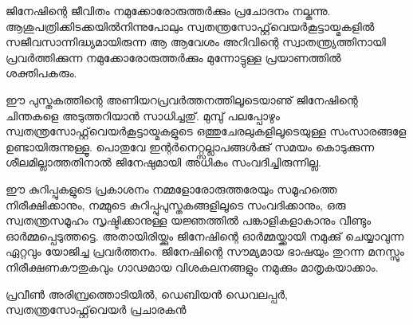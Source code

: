 
ജിനേഷിന്റെ ജീവിതം നമുക്കോരോരുത്തര്‍ക്കും പ്രചോദനം നല്കുന്നു. ആശുപത്രിക്കിടക്കയില്‍നിന്നുപോലും സ്വതന്ത്രസോഫ്റ്റ്‌വെയര്‍കൂട്ടായ്മകളില്‍ സജീവസാന്നിദ്ധ്യമായിരുന്ന ആ ആവേശം അറിവിന്റെ സ്വാതന്ത്ര്യത്തിനായി പ്രവര്‍ത്തിക്കുന്ന നമുക്കോരോരുത്തര്‍ക്കും മുന്നോട്ടുള്ള പ്രയാണത്തില്‍ ശക്തിപകരും. 

ഈ പുസ്തകത്തിന്റെ അണിയറപ്രവര്‍ത്തനത്തിലൂടെയാണു് ജിനേഷിന്റെ ചിന്തകളെ അടുത്തറിയാന്‍ സാധിച്ചതു്. മുമ്പു് പലപ്പോഴും സ്വതന്ത്രസോഫ്റ്റ്‌വെയര്‍കൂട്ടായ്മകളുടെ ഒത്തുചേരലുകളിലൂടെയുള്ള സംസാരങ്ങളേ ഉണ്ടായിരുന്നുള്ളൂ. പൊതുവേ ഇന്റര്‍നെറ്റ്സല്ലാപങ്ങള്‍ക്കു് സമയം കൊടുക്കുന്ന ശീലമില്ലാത്തതിനാല്‍ ജിനേഷുമായി അധികം സംവദിച്ചിരുന്നില്ല.

ഈ കുറിപ്പുകളുടെ പ്രകാശനം നമ്മളോരോരുത്തരേയും സമൂഹത്തെ നിരീക്ഷിക്കാനും, നമ്മുടെ കുറിപ്പുപുസ്തകങ്ങളിലൂടെ സംവദിക്കാനും, ഒരു സ്വതന്ത്രസമൂഹം സൃഷ്ടിക്കാനുള്ള യജ്ഞത്തില്‍ പങ്കാളികളാകാനും വീണ്ടും ഓര്‍മ്മപ്പെടുത്തട്ടെ. അതായിരിയ്ക്കും ജിനേഷിന്റെ ഓര്‍മ്മയ്ക്കായി നമുക്കു് ചെയ്യാവുന്ന ഏറ്റവും യോജിച്ച പ്രവര്‍ത്തനം. ജിനേഷിന്റെ സൗമ്യമായ ഭാഷയും തുറന്ന മനസ്സും നിരീക്ഷണകൗതുകവും ഗാഢമായ വിശകലനങ്ങളും നമുക്കും മാതൃകയാക്കാം.

\begin{flushright}പ്രവീണ്‍ അരിമ്പ്രത്തൊടിയില്‍, ഡെബിയന്‍ ഡെവലപ്പര്‍, സ്വതന്ത്രസോഫ്റ്റ്‌വെയര്‍ പ്രചാരകന്‍\end{flushright}
\newpage
